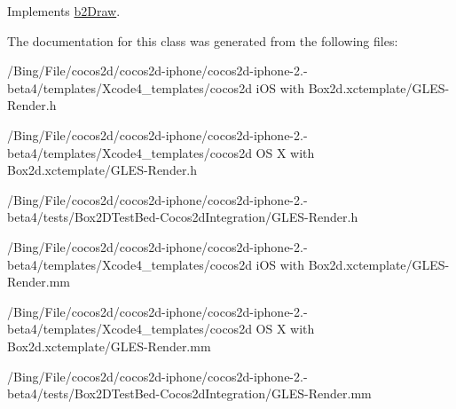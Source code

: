 Implements \hyperlink{classb2_draw_ade698123482a491a7a61fa1fe4d3a4f4}{b2\-Draw}.



The documentation for this class was generated from the following files\-:\begin{DoxyCompactItemize}
\item 
/\-Bing/\-File/cocos2d/cocos2d-\/iphone/cocos2d-\/iphone-\/2.-\/beta4/templates/\-Xcode4\-\_\-templates/cocos2d i\-O\-S with Box2d.\-xctemplate/G\-L\-E\-S-\/\-Render.\-h\item 
/\-Bing/\-File/cocos2d/cocos2d-\/iphone/cocos2d-\/iphone-\/2.-\/beta4/templates/\-Xcode4\-\_\-templates/cocos2d O\-S X with Box2d.\-xctemplate/G\-L\-E\-S-\/\-Render.\-h\item 
/\-Bing/\-File/cocos2d/cocos2d-\/iphone/cocos2d-\/iphone-\/2.-\/beta4/tests/\-Box2\-D\-Test\-Bed-\/\-Cocos2d\-Integration/G\-L\-E\-S-\/\-Render.\-h\item 
/\-Bing/\-File/cocos2d/cocos2d-\/iphone/cocos2d-\/iphone-\/2.-\/beta4/templates/\-Xcode4\-\_\-templates/cocos2d i\-O\-S with Box2d.\-xctemplate/G\-L\-E\-S-\/\-Render.\-mm\item 
/\-Bing/\-File/cocos2d/cocos2d-\/iphone/cocos2d-\/iphone-\/2.-\/beta4/templates/\-Xcode4\-\_\-templates/cocos2d O\-S X with Box2d.\-xctemplate/G\-L\-E\-S-\/\-Render.\-mm\item 
/\-Bing/\-File/cocos2d/cocos2d-\/iphone/cocos2d-\/iphone-\/2.-\/beta4/tests/\-Box2\-D\-Test\-Bed-\/\-Cocos2d\-Integration/G\-L\-E\-S-\/\-Render.\-mm\end{DoxyCompactItemize}

